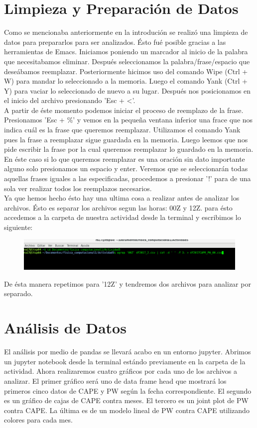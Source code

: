 \documentclass{article}
\begin{document}
\section{Limpieza y Preparación de Datos}
Como se mencionaba anteriormente en la introdución se realizó una limpieza de datos para prepararlos para ser analizados. Ésto fué posible gracias a las herramientas de Emacs. Iniciamos poniendo un marcador al inicio de la palabra que necesitabamos eliminar. Después seleccionamos la palabra/frase/espacio que deseábamos reemplazar. Posteriormente hicimos uso del comando Wipe (Ctrl + W) para mandar lo seleccionado a la memoria. Luego el comando Yank (Ctrl + Y) para vaciar lo seleccionado de nuevo a su lugar. Después nos posicionamos en el inicio del archivo presionando 'Esc + <'.\\
A partir de éste momento podemos iniciar el proceso de reemplazo de la frase. Presionamos 'Esc + \%' y vemos en la pequeña ventana inferior una frace que nos indica cuál es la frase que queremos reemplazar. Utilizamos el comando Yank pues la frase a reemplazar sigue guardada en la memoria. Luego leemos que nos pide escribir la frase por la cual queremos reemplazar lo guardado en la memoria. En éste caso si lo que queremos reemplazar es una oración sin dato importante alguno solo presionamos un espacio y enter. Veremos que se seleccionarán todas aquellas frases iguales a las especificadas, procedemos a presionar '!' para de una sola ver realizar todos los reemplazos necesarios.\\
Ya que hemos hecho ésto hay una ultima cosa a realizar antes de analizar los archivos. Ésto es separar los archivos segun las horas: 00Z y 12Z. para ésto accedemos a la carpeta de nuestra actividad desde la terminal y escribimos lo siguiente:\\
\begin{figure}[H]
	\centering
    \includegraphics[width=\linewidth]{r5.png}\\
\end{figure}
De ésta manera repetimos para '12Z' y tendremos dos archivos para analizar por separado.\\
\section{Análisis de Datos}
El análisis por medio de pandas se llevará acabo en un entorno jupyter. Abrimos un jupyter notebook desde la terminal estándo previamente en la carpeta de la actividad. Ahora realizaremos cuatro gráficos por cada uno de los archivos a analizar. El primer gráfico será uno de data frame head que mostrará los primeros cinco datos de CAPE y PW según la fecha correspondiente. El segundo es un gráfico de cajas de CAPE contra meses. El tercero es un joint plot de PW contra CAPE. La última es de un modelo lineal de PW contra CAPE utilizando colores para cada mes.\\
\end{document}
